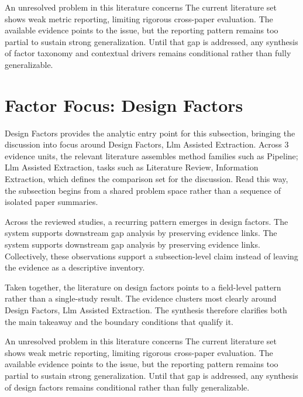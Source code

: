 \documentclass{article}
\begin{document}
An unresolved problem in this literature concerns The current literature set shows weak metric reporting, limiting rigorous cross-paper evaluation. The available evidence points to the issue, but the reporting pattern remains too partial to sustain strong generalization. Until that gap is addressed, any synthesis of factor taxonomy and contextual drivers remains conditional rather than fully generalizable. \cite{02_2003_brosseau_trf,01_2001_hamed_safety_science}

\section{Factor Focus: Design Factors}
Design Factors provides the analytic entry point for this subsection, bringing the discussion into focus around Design Factors, Llm Assisted Extraction. Across 3 evidence units, the relevant literature assembles method families such as Pipeline; Llm Assisted Extraction, tasks such as Literature Review, Information Extraction, which defines the comparison set for the discussion. Read this way, the subsection begins from a shared problem space rather than a sequence of isolated paper summaries. \cite{02_2003_brosseau_trf,01_2001_hamed_safety_science}

Across the reviewed studies, a recurring pattern emerges in design factors. The system supports downstream gap analysis by preserving evidence links. The system supports downstream gap analysis by preserving evidence links. Collectively, these observations support a subsection-level claim instead of leaving the evidence as a descriptive inventory. \cite{02_2003_brosseau_trf,01_2001_hamed_safety_science,03_2006_yang_tra}

Taken together, the literature on design factors points to a field-level pattern rather than a single-study result. The evidence clusters most clearly around Design Factors, Llm Assisted Extraction. The synthesis therefore clarifies both the main takeaway and the boundary conditions that qualify it. \cite{02_2003_brosseau_trf,01_2001_hamed_safety_science}

An unresolved problem in this literature concerns The current literature set shows weak metric reporting, limiting rigorous cross-paper evaluation. The available evidence points to the issue, but the reporting pattern remains too partial to sustain strong generalization. Until that gap is addressed, any synthesis of design factors remains conditional rather than fully generalizable. \cite{02_2003_brosseau_trf,01_2001_hamed_safety_science}
\end{document}
